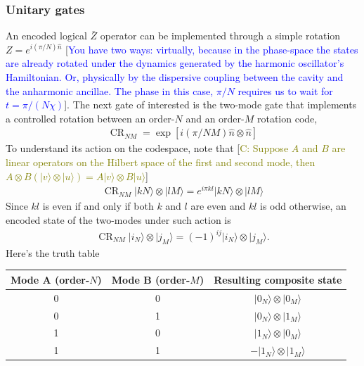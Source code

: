 \documentclass{article}
\DeclareMathOperator{\CR}{\text{CR}}
\begin{document}
\subsubsection{Unitary gates}
An encoded logical $\bar{Z}$ operator can be implemented through a simple rotation $Z=e^{i(\pi/N)\hat{n}}$ [\textcolor{blue}{You have two ways: virtually, because in the phase-space the states are already rotated under the dynamics generated by the harmonic oscillator's Hamiltonian. Or, physically by the dispersive coupling \cite{joshi2021} between the cavity and the anharmonic ancillae. The phase in this case, $\pi/N$ requires us to wait for $t=\pi/(N\chi)$}]. The next gate of interested is the two-mode gate that implements a controlled rotation between an order-$N$ and an order-$M$ rotation code,
\begin{align}
    \CR_{NM} = \exp[i(\pi/NM)\hat{n}\otimes\hat{n}]
\end{align}
To understand its action on the codespace, note that [\textcolor{olive}{C: Suppose $A$ and $B$ are linear operators on the Hilbert space of the first and second mode, then $A\otimes B(|v\rangle \otimes |u\rangle)=A|v\rangle \otimes B|u\rangle$}]
\begin{align}
    \CR_{NM}|kN\rangle \otimes |lM\rangle =e^{i\pi kl}|kN\rangle\otimes |lM\rangle
\end{align}
Since $kl$ is even if and only if both $k$ and $l$ are even and $kl$ is odd otherwise, an encoded state of the two-modes under such action is 
\begin{align}
    \CR_{NM}|i_N\rangle \otimes |j_M\rangle = (-1)^{ij}|i_N\rangle\otimes |j_M\rangle.
\end{align}
Here's the truth table
\begin{table}[h!]
\centering
\begin{tabular}{|c|c|c|}
\hline
Mode A (order-$N$) & Mode B (order-$M$) & Resulting composite state         \\ \hline
0                  & 0                  & $|0_N\rangle\otimes |0_M\rangle$  \\ \hline
0                  & 1                  & $|0_N\rangle\otimes |1_M\rangle$ \\ \hline
1                  & 0                  & $|1_N\rangle\otimes |0_M\rangle$ \\ \hline
1                  & 1                  & $-|1_N\rangle\otimes |1_M\rangle$  \\ \hline
\end{tabular}
\end{table}
\end{document}
